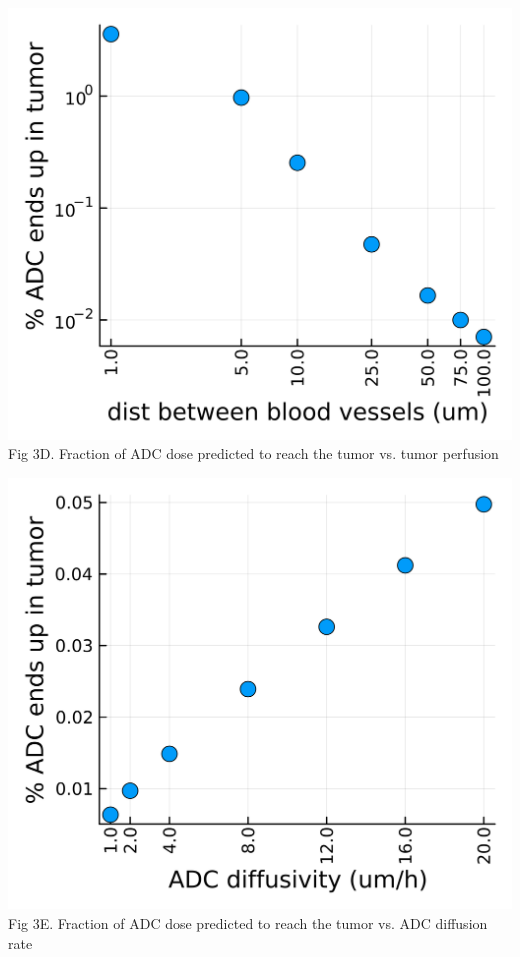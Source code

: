 \documentclass[portrait,fontscale=0.3,paperwidth=36in,paperheight=48in]{baposter}
\begin{document}
\begin{poster}
{\begin{minipage}[ht]{0.23\linewidth}
\end{minipage}
\hspace{0.2cm}
\begin{minipage}[c]{0.23\linewidth}
\centering
\includegraphics[width=\textwidth]{../img/param-scan/Rkrogh-tumor-ADC-percentage.png}
\tiny{Fig 3D. Fraction of ADC dose predicted to reach the tumor vs. tumor perfusion}
\end{minipage}
\hspace{0.2cm}
\begin{minipage}[c]{0.23\linewidth}
\centering
\includegraphics[width=\textwidth]{../img/param-scan/P-ADC-tumor-ADC-percentage.png}
\tiny{Fig 3E. Fraction of ADC dose predicted to reach the tumor vs. ADC diffusion rate}
\end{minipage}

}
\end{poster}
\end{document}
